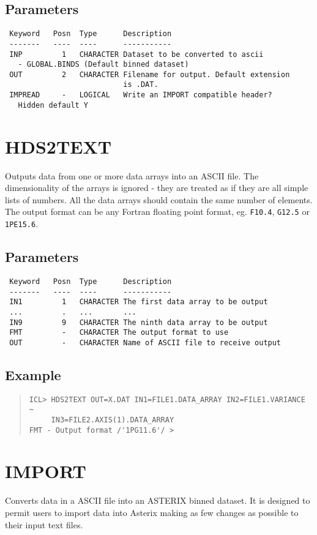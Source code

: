 \documentclass{book}
\renewcommand{\_}{{\tt\char'137}}     %
\begin{document}
\subsection{Parameters}
\begin{verbatim}
 Keyword   Posn  Type      Description
 -------   ----  ----      -----------
 INP         1   CHARACTER Dataset to be converted to ascii
   - GLOBAL.BINDS (Default binned dataset)
 OUT         2   CHARACTER Filename for output. Default extension
                           is .DAT.
 IMPREAD     -   LOGICAL   Write an IMPORT compatible header?
   Hidden default Y

\end{verbatim}\section{HDS2TEXT}
Outputs data from one or more data arrays into an ASCII file. The
dimensionality of the arrays is ignored - they are treated as if
they are all simple lists of numbers. All the data arrays should
contain the same number of elements.
The output format can be any Fortran floating point format, eg.
{\tt F10.4}, {\tt G12.5} or {\tt 1PE15.6}.

\subsection{Parameters}
\begin{verbatim}
 Keyword   Posn  Type      Description
 -------   ----  ----      -----------
 IN1         1   CHARACTER The first data array to be output
 ...         .   ...       ...
 IN9         9   CHARACTER The ninth data array to be output
 FMT         -   CHARACTER The output format to use
 OUT         -   CHARACTER Name of ASCII file to receive output

\end{verbatim}\subsection{Example}
\begin{quote}\begin{verbatim}
ICL> HDS2TEXT OUT=X.DAT IN1=FILE1.DATA_ARRAY IN2=FILE1.VARIANCE ~
     IN3=FILE2.AXIS(1).DATA_ARRAY
FMT - Output format /'1PG11.6'/ >
\end{verbatim}\end{quote}
\section{IMPORT}
Converts data in a ASCII file into an ASTERIX binned dataset. It
is designed to permit users to import data into Asterix making as
few changes as possible to their input text files.
\end{document}
